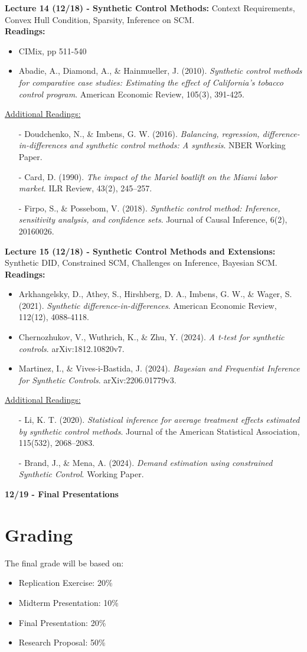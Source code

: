 \documentclass[12pt]{article}
\begin{document}
\textbf{Lecture 14 (12/18) - Synthetic Control Methods:} Context Requirements, Convex Hull Condition, Sparsity, Inference on SCM.\\
\textbf{Readings:}
\begin{itemize}
    \item CIMix, pp 511-540
    \item Abadie, A., Diamond, A., \& Hainmueller, J. (2010). \emph{Synthetic control methods for comparative case studies: Estimating the effect of California’s tobacco control program}. American Economic Review, 105(3), 391-425.
\end{itemize}
\underline{Additional Readings:}
\begin{itemize}
    \item[-] Doudchenko, N., \& Imbens, G. W. (2016). \emph{Balancing, regression, difference-in-differences and synthetic control methods: A synthesis}. NBER Working Paper.
    \item[-] Card, D. (1990). \emph{The impact of the Mariel boatlift on the Miami labor market}. ILR Review, 43(2), 245–257.
    \item[-] Firpo, S., \& Possebom, V. (2018). \emph{Synthetic control method: Inference, sensitivity analysis, and confidence sets}. Journal of Causal Inference, 6(2), 20160026.
\end{itemize}

\textbf{Lecture 15 (12/18) - Synthetic Control Methods and Extensions:} Synthetic DID, Constrained SCM, Challenges on Inference, Bayesian SCM.\\
\textbf{Readings:}
\begin{itemize}
    \item Arkhangelsky, D., Athey, S., Hirshberg, D. A., Imbens, G. W., \& Wager, S. (2021). \emph{Synthetic difference-in-differences}. American Economic Review, 112(12), 4088-4118.
    \item Chernozhukov, V., Wuthrich, K., \& Zhu, Y. (2024). \emph{A t-test for synthetic controls}. arXiv:1812.10820v7.
    \item Martinez, I., \& Vives-i-Bastida, J. (2024). \emph{Bayesian and Frequentist Inference for Synthetic Controls}. arXiv:2206.01779v3.
\end{itemize}
\underline{Additional Readings:}
\begin{itemize}
    \item[-] Li, K. T. (2020). \emph{Statistical inference for average treatment effects estimated by synthetic control methods}. Journal of the American Statistical Association, 115(532), 2068–2083.
    \item[-] Brand, J., \& Mena, A. (2024). \emph{Demand estimation using constrained Synthetic Control}. Working Paper.
\end{itemize}


\textbf{12/19 - Final Presentations}

\section*{Grading}
The final grade will be based on:
\begin{itemize}
    \item Replication Exercise: 20\%
    \item Midterm Presentation: 10\%
    \item Final Presentation: 20\%
    \item Research Proposal: 50\%
\end{itemize}
\end{document}
